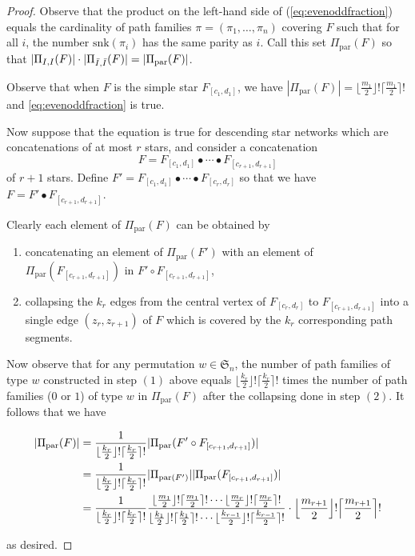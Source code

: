 \documentclass[12pt]{amsart}
\DeclarePairedDelimiter\ceil{\lceil}{\rceil}
\DeclarePairedDelimiter\floor{\lfloor}{\rfloor}
\theoremstyle{definition}
\numberwithin{equation}{section}
\newcommand{\sn}{\mathfrak{S}_n}
\newcommand{\snk}{\mathrm{snk}}
\begin{document}
\begin{proof}
Observe that the product on the left-hand side of (\ref{eq:evenoddfraction}) equals the cardinality of path families $\pi = (\pi_1,\dotsc,\pi_n)$ covering $F$ such that
for all $i$, the number
$\snk(\pi_i)$ has the same parity as $i$.  Call this set $\Pi_{\text{par}}(F)$ so that $|\Pi_{I,I}(F)| \cdot |\Pi_{\Bar I, \Bar I}(F)| = |\Pi_{\text{par}}(F)|$.

Observe that when $F$ is the simple star $F_{[c_1, d_1]}$, we have $|\Pi_{\text{par}}(F)|=\lfloor{\frac{m_1}{2}}\rfloor!\lceil \frac{m_1}{2}\rceil!$ and \eqref{eq:evenoddfraction} is true.

    Now suppose that the equation is true for descending star networks which are
    concatenations of at most $r$ stars, and consider a concatenation
    \begin{equation}\label{eq:Fs+2}
        F = F_{[c_1,d_1]} \bullet \cdots \bullet F_{[c_{r+1},d_{r+1}]}
    \end{equation}
    of $r+1$ stars. Define $F' = F_{[c_1,d_1]} \bullet \cdots \bullet F_{[c_{r},d_{r}]}$ so that we have $F = F' \bullet F_{[c_{r+1},d_{r+1}]}$.

Clearly each element of $\Pi_{\text{par}}(F)$ can be obtained by
\begin{enumerate}
    \item concatenating an element of $\Pi_{\text{par}}(F')$ with an element of $\Pi_{\text{par}}(F_{[c_{r+1},d_{r+1}]})$ in $F' \circ F_{[c_{r+1}, d_{r+1}]}$,
\item collapsing the $k_{r}$ edges from the central vertex of $F_{[c_{r},d_{r}]}$ to $F_{[c_{r+1},d_{r+1}]}$ into
a single edge $(z_r, z_{r+1})$ of $F$ which is covered by the $k_{r}$ corresponding path segments.
\end{enumerate}
Now observe that for any permutation $w \in \sn$,
the number of path families of type $w$ constructed in step $(1)$ above
equals $\lfloor \tfrac{k_{r}}2 \rfloor !
    \lceil \tfrac{k_{r}}2 \rceil !$
times the number of path families ($0$ or $1$) of type $w$ in $\Pi_{\text{par}}(F)$ after the collapsing done in step $(2)$.
It follows that we have

\begin{align*}
    |\Pi_{\text{par}}(F)|&=\frac{1}{\lfloor \frac{k_r}{2}\rfloor!\lceil \frac{k_r}{2}\rceil!}|\Pi_{\text{par}}(F'\circ F_{[c_{r+1},d_{r+1}]})|\\
    & =\frac{1}{\lfloor \frac{k_r}{2}\rfloor!\lceil \frac{k_r}{2}\rceil!}|\Pi_{\text{par}(F')}| |\Pi_{\text{par}}(F_{[c_{r+1},d_{r+1}]})|\\
    & =\frac{1}{\lfloor \frac{k_r}{2}\rfloor!\lceil \frac{k_r}{2}\rceil!}\frac{\lfloor \frac{m_1}{2}\rfloor!\lceil \frac{m_1}{2}\rceil!\cdots \lfloor \frac{m_r}{2}\rfloor!\lceil\frac{m_r}{2}\rceil!}{\lfloor \frac{k_1}{2}\rfloor!\lceil \frac{k_1}{2}\rceil!\cdots \lfloor \frac{k_{r-1}}{2}\rfloor!\lceil\frac{k_{r-1}}{2}\rceil!}\cdot \floor*{ \frac{m_{r+1}}{2}} !\ceil*{ \frac{m_{r+1}}{2}}!
\end{align*}

as desired.

\end{proof}
\end{document}
